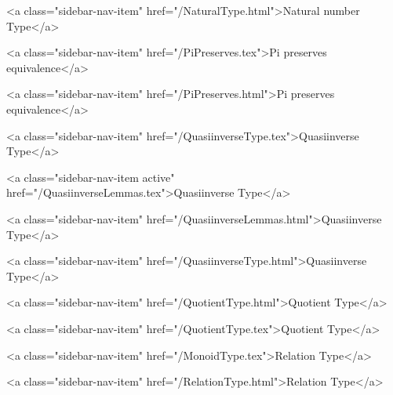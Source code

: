       
        
          <a class="sidebar-nav-item" href="/NaturalType.html">Natural number Type</a>
        
      
    
      
        
          <a class="sidebar-nav-item" href="/PiPreserves.tex">Pi preserves equivalence</a>
        
      
    
      
        
          <a class="sidebar-nav-item" href="/PiPreserves.html">Pi preserves equivalence</a>
        
      
    
      
        
          <a class="sidebar-nav-item" href="/QuasiinverseType.tex">Quasiinverse Type</a>
        
      
    
      
        
          <a class="sidebar-nav-item active" href="/QuasiinverseLemmas.tex">Quasiinverse Type</a>
        
      
    
      
        
          <a class="sidebar-nav-item" href="/QuasiinverseLemmas.html">Quasiinverse Type</a>
        
      
    
      
        
          <a class="sidebar-nav-item" href="/QuasiinverseType.html">Quasiinverse Type</a>
        
      
    
      
        
          <a class="sidebar-nav-item" href="/QuotientType.html">Quotient Type</a>
        
      
    
      
        
          <a class="sidebar-nav-item" href="/QuotientType.tex">Quotient Type</a>
        
      
    
      
        
          <a class="sidebar-nav-item" href="/MonoidType.tex">Relation Type</a>
        
      
    
      
        
          <a class="sidebar-nav-item" href="/RelationType.html">Relation Type</a>
        
